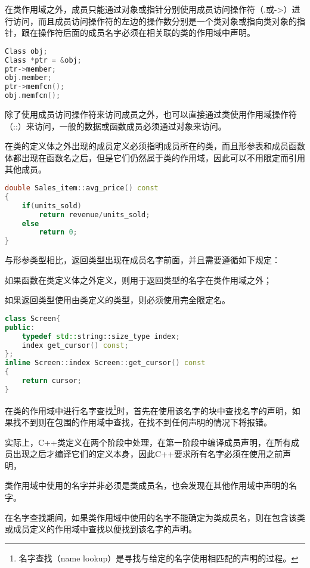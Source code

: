 在类作用域之外，成员只能通过对象或指针分别使用成员访问操作符（.或->）进行访问，而且成员访问操作符的左边的操作数分别是一个类对象或指向类对象的指针，跟在操作符后面的成员名字必须在相关联的类的作用域中声明。




\begin{lstlisting}[language=C++]
Class obj;
Class *ptr = &obj;
ptr->member;
obj.member;
ptr->memfcn();
obj.memfcn();
\end{lstlisting}

除了使用成员访问操作符来访问成员之外，也可以直接通过类使用作用域操作符（::）来访问，一般的数据或函数成员必须通过对象来访问。

在类的定义体之外出现的成员定义必须指明成员所在的类，而且形参表和成员函数体都出现在函数名之后，但是它们仍然属于类的作用域，因此可以不用限定而引用其他成员。

\begin{lstlisting}[language=C++]
double Sales_item::avg_price() const
{
	if(units_sold)
		return revenue/units_sold;
	else
		return 0;
}
\end{lstlisting}

与形参类型相比，返回类型出现在成员名字前面，并且需要遵循如下规定：

\begin{compactitem}
\item 如果函数在类定义体之外定义，则用于返回类型的名字在类作用域之外；
\item 如果返回类型使用由类定义的类型，则必须使用完全限定名。
\end{compactitem}

\begin{lstlisting}[language=C++]
class Screen{
public:
	typedef std::string::size_type index;
	index get_cursor() const;
};
inline Screen::index Screen::get_cursor() const
{
	return cursor;
}
\end{lstlisting}

在类的作用域中进行名字查找\footnote{名字查找（name lookup）是寻找与给定的名字使用相匹配的声明的过程。}时，首先在使用该名字的块中查找名字的声明，如果找不到则在包围的作用域中查找，在找不到任何声明的情况下将报错。

实际上，C++类定义在两个阶段中处理，在第一阶段中编译成员声明，在所有成员出现之后才编译它们的定义本身，因此C++要求所有名字必须在使用之前声明，

类作用域中使用的名字并非必须是类成员名，也会发现在其他作用域中声明的名字。

在名字查找期间，如果类作用域中使用的名字不能确定为类成员名，则在包含该类或成员定义的作用域中查找以便找到该名字的声明。


